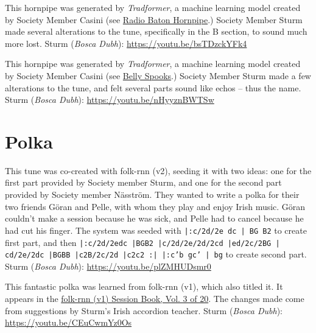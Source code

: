 \documentclass[a4paper,notitlepage,twoside]{book}
\begin{document}
{}  
  
\hypertarget{hornpipe:BellySpooks}{}
This hornpipe was generated by {\em Tradformer}, 
a machine learning model created by Society Member Casini
(see \hyperlink{hornpipe:RadioBatonHornpipe}{Radio Baton Hornpipe}.)
Society Member Sturm made several alterations to the tune,
specifically in the B section, to sound much more lost.
Sturm ({\em Bosca Dubh}): \url{https://youtu.be/bsTDzckYFk4}

{}  
  
\hypertarget{hornpipe:EchoHornpipe}{}
This hornpipe was generated by {\em Tradformer}, 
a machine learning model created by Society Member Casini
(see \hyperlink{hornpipe:BellySpooks}{Belly Spooks}.)
Society Member Sturm made a few alterations to the tune,
and felt several parts sound like echos -- thus the name.
Sturm ({\em Bosca Dubh}): \url{https://youtu.be/nHyyznBWTSw}

\clearpage
\section{Polka}
{}  
 
\hypertarget{polka:GoranPelle}{}
This tune was co-created with folk-rnn (v2), seeding it with two ideas: 
one for the first part provided by Society member Sturm, 
and one for the second part provided by Society member Näsström. 
They wanted to write a polka for their two friends Göran and Pelle, 
with whom they play and enjoy Irish music. 
Göran couldn't make a session because he was sick, 
and Pelle had to cancel because he had cut his finger.
The system was seeded with {\tt |:c/2d/2e dc | BG B2} to create first part,
and then 
{\tt |:c/2d/2edc |BGB2 |c/2d/2e/2d/2cd |ed/2c/2BG | cd/2e/2dc |BGBB |c2B/2c/2d |c2c2 :| |:c'b gc' | bg}
to create second part.
Sturm ({\em Bosca Dubh}): \url{https://youtu.be/plZMHUDsmr0}

{}  
  
\hypertarget{polka:WilliamMurphys}{}
This fantastic polka was learned from folk-rnn (v1), which also titled it.
It appears in the \href{https://highnoongmt.wordpress.com/2018/01/05/volumes-1-20-of-folk-rnn-v1-transcriptions}{folk-rnn (v1) Session Book, Vol. 3 of 20}.
The changes made come from suggestions by Sturm's Irish accordion teacher.
Sturm ({\em Bosca Dubh}): \url{https://youtu.be/CEuCwmYz0Os}
\end{document}
